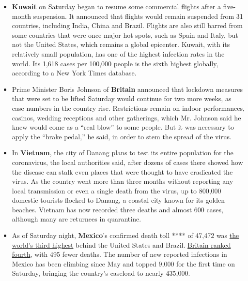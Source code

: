 \begin{itemize}
\item
  \textbf{Kuwait} on Saturday began to resume some commercial flights
  after a five-month suspension. It announced that flights would remain
  suspended from 31 countries, including India, China and Brazil.
  Flights are also still barred from some countries that were once major
  hot spots, such as Spain and Italy, but not the United States, which
  remains a global epicenter. Kuwait, with its relatively small
  population, has one of the highest infection rates in the world. Its
  1,618 cases per 100,000 people is the sixth highest globally,
  according to a New York Times database.
\item
  Prime Minister Boris Johnson of \textbf{Britain} announced that
  lockdown measures that were set to be lifted Saturday would continue
  for two more weeks, as case numbers in the country rise. Restrictions
  remain on indoor performances, casinos, wedding receptions and other
  gatherings, which Mr. Johnson said he knew would come as a ``real
  blow'' to some people. But it was necessary to apply the ``brake
  pedal,'' he said, in order to stem the spread of the virus.
\item
  In \textbf{Vietnam}, the city of Danang plans to test its entire
  population for the coronavirus, the local authorities said, after
  dozens of cases there showed how the disease can stalk even places
  that were thought to have eradicated the virus. As the country went
  more than three months without reporting any local transmission or
  even a single death from the virus, up to 800,000 domestic tourists
  flocked to Danang, a coastal city known for its golden beaches.
  Vietnam has now recorded three deaths and almost 600 cases, although
  many are returnees in quarantine.
\item
  As of Saturday night, \textbf{Mexico}'s confirmed death toll **** of
  47,472 was
  \href{https://www.nytimes3xbfgragh.onion/interactive/2020/world/americas/mexico-coronavirus-cases.html}{the
  world's third highest} behind the United States and Brazil.
  \href{https://www.nytimes3xbfgragh.onion/interactive/2020/world/europe/united-kingdom-coronavirus-cases.html}{Britain
  ranked fourth}, with 495 fewer deaths. The number of new reported
  infections in Mexico has been climbing since May and topped 9,000 for
  the first time on Saturday, bringing the country's caseload to nearly
  435,000.
\end{itemize}

